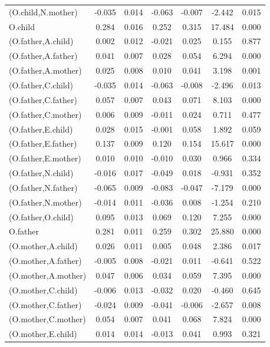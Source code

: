 \documentclass[11pt,a5paper,twoside]{book}
\begin{document}
\begin{center}
\begin{longtable}{lcccccc}
   (O.child,N.mother)  & -0.035 & 0.014 & -0.063 & -0.007 & -2.442 & 0.015 \\ 
   O.child  & 0.284 & 0.016 & 0.252 & 0.315 & 17.484 & 0.000 \\ 
   (O.father,A.child)  & 0.002 & 0.012 & -0.021 & 0.025 & 0.155 & 0.877 \\ 
   (O.father,A.father)  & 0.041 & 0.007 & 0.028 & 0.054 & 6.294 & 0.000 \\ 
   (O.father,A.mother)  & 0.025 & 0.008 & 0.010 & 0.041 & 3.198 & 0.001 \\ 
   (O.father,C.child)  & -0.035 & 0.014 & -0.063 & -0.008 & -2.496 & 0.013 \\ 
   (O.father,C.father)  & 0.057 & 0.007 & 0.043 & 0.071 & 8.103 & 0.000 \\ 
   (O.father,C.mother)  & 0.006 & 0.009 & -0.011 & 0.024 & 0.711 & 0.477 \\ 
   (O.father,E.child)  & 0.028 & 0.015 & -0.001 & 0.058 & 1.892 & 0.059 \\ 
   (O.father,E.father)  & 0.137 & 0.009 & 0.120 & 0.154 & 15.617 & 0.000 \\ 
   (O.father,E.mother)  & 0.010 & 0.010 & -0.010 & 0.030 & 0.966 & 0.334 \\ 
   (O.father,N.child)  & -0.016 & 0.017 & -0.049 & 0.018 & -0.931 & 0.352 \\ 
   (O.father,N.father)  & -0.065 & 0.009 & -0.083 & -0.047 & -7.179 & 0.000 \\ 
   (O.father,N.mother)  & -0.014 & 0.011 & -0.036 & 0.008 & -1.254 & 0.210 \\ 
   (O.father,O.child)  & 0.095 & 0.013 & 0.069 & 0.120 & 7.255 & 0.000 \\ 
   O.father  & 0.281 & 0.011 & 0.259 & 0.302 & 25.880 & 0.000 \\ 
   (O.mother,A.child)  & 0.026 & 0.011 & 0.005 & 0.048 & 2.386 & 0.017 \\ 
   (O.mother,A.father)  & -0.005 & 0.008 & -0.021 & 0.011 & -0.641 & 0.522 \\ 
   (O.mother,A.mother)  & 0.047 & 0.006 & 0.034 & 0.059 & 7.395 & 0.000 \\ 
   (O.mother,C.child)  & -0.006 & 0.013 & -0.032 & 0.020 & -0.460 & 0.645 \\ 
   (O.mother,C.father)  & -0.024 & 0.009 & -0.041 & -0.006 & -2.657 & 0.008 \\ 
   (O.mother,C.mother)  & 0.054 & 0.007 & 0.041 & 0.068 & 7.824 & 0.000 \\ 
   (O.mother,E.child)  & 0.014 & 0.014 & -0.013 & 0.041 & 0.993 & 0.321 \\ 

\end{longtable}
\end{center}
\end{document}
